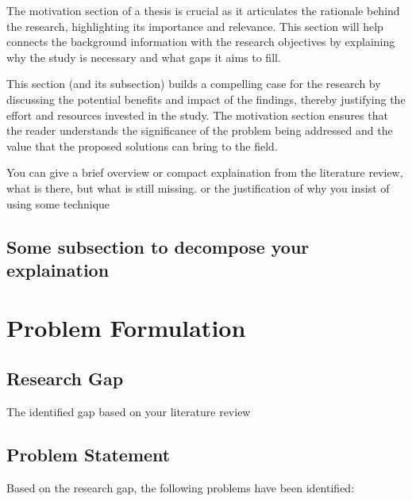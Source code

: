The motivation section of a thesis is crucial as it articulates the rationale behind the research, highlighting its importance and relevance. This section will help connects the background information with the research objectives by explaining why the study is necessary and what gaps it aims to fill. 

This section (and its subsection) builds a compelling case for the research by discussing the potential benefits and impact of the findings, thereby justifying the effort and resources invested in the study. The motivation section ensures that the reader understands the significance of the problem being addressed and the value that the proposed solutions can bring to the field.

You can give a brief overview or compact explaination from the literature review, what is there, but what is still missing. or the justification of why you insist of using some technique


\subsection{Some subsection to decompose your explaination}




\section{Problem Formulation}


\subsection{Research Gap}

The identified gap based on your literature review


\subsection{Problem Statement}

Based on the research gap, the following problems have been identified:

